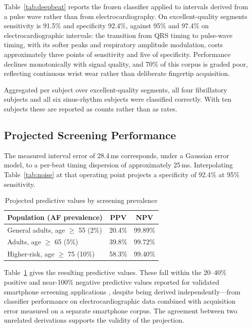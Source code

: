 \documentclass[conference]{IEEEtran}
\begin{document}
Table~\ref{tab:deepbeat} reports the frozen classifier applied to intervals derived from
a pulse wave rather than from electrocardiography. On excellent-quality segments
sensitivity is 91.5\% and specificity 92.4\%, against 95\% and 97.4\% on
electrocardiographic intervals: the transition from QRS timing to pulse-wave timing,
with its softer peaks and respiratory amplitude modulation, costs approximately three
points of sensitivity and five of specificity. Performance declines monotonically with
signal quality, and 70\% of this corpus is graded poor, reflecting continuous wrist wear
rather than deliberate fingertip acquisition.

Aggregated per subject over excellent-quality segments, all four fibrillatory subjects
and all six sinus-rhythm subjects were classified correctly. With ten subjects these are
reported as counts rather than as rates.

\subsection{Projected Screening Performance}
The measured interval error of 28.4\,ms corresponds, under a Gaussian error model,
to a per-beat timing dispersion of approximately 25\,ms. Interpolating
Table~\ref{tab:noise} at that operating point projects a specificity of 92.4\% at
95\% sensitivity.

\begin{table}[t]
\caption{Projected predictive values by screening prevalence}
\label{tab:ppv}
\centering
\footnotesize
\begin{tabular}{lcc}
\toprule
Population (AF prevalence) & PPV & NPV \\
\midrule
General adults, age $\geq$ 55 \quad (2\%)  & 20.4\% & 99.89\% \\
Adults, age $\geq$ 65 \quad (5\%)          & 39.8\% & 99.72\% \\
Higher-risk, age $\geq$ 75 \quad (10\%)    & 58.3\% & 99.40\% \\
\bottomrule
\end{tabular}
\end{table}

Table~\ref{tab:ppv} gives the resulting predictive values. These fall within the
20--40\% positive and near-100\% negative predictive values reported for validated
smartphone screening applications \cite{oconnor2020}, despite being derived
independently---from classifier performance on electrocardiographic data combined
with acquisition error measured on a separate smartphone corpus. The agreement
between two unrelated derivations supports the validity of the projection.
\end{document}
